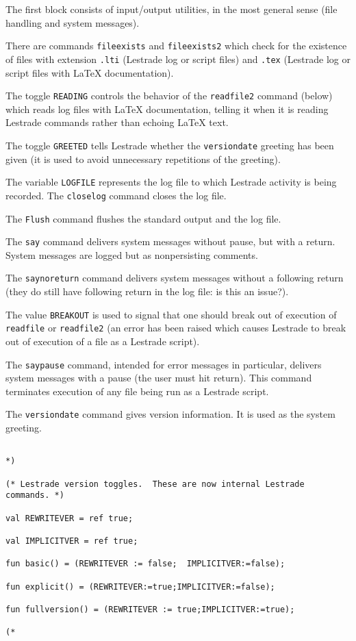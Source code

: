 \documentclass{article}
\begin{document}
The first block consists of input/output utilities, in the most general sense (file handling and system messages).

There are commands {\tt fileexists} and {\tt fileexists2} which check for the existence of 
files with extension {\tt .lti} (Lestrade log or script files) and {\tt .tex} (Lestrade log or
 script files with LaTeX documentation).

The toggle {\tt READING} controls the behavior of the {\tt readfile2} command (below)  which reads log files with LaTeX documentation, telling it when it is reading Lestrade commands rather than echoing LaTeX text.

The toggle {\tt GREETED} tells Lestrade whether the {\tt versiondate} greeting has been given (it is used to avoid unnecessary repetitions of the greeting).

The variable {\tt LOGFILE} represents the log file to which Lestrade activity is being recorded.  The {\tt closelog} command closes the log file.

The {\tt Flush} command flushes the standard output and the log file.

The {\tt say} command delivers system messages without pause, but with a return.  System messages are logged but as nonpersisting comments.

The {\tt saynoreturn} command delivers system messages without a following return (they do still have following return in the log file:  is this an issue?).

The value {\tt BREAKOUT} is used to signal that one should break out of execution of {\tt readfile} or {\tt readfile2} (an error has been raised which causes Lestrade to break out of execution of a  file as a Lestrade script).

The {\tt saypause} command, intended for error messages in particular, delivers system messages with a pause (the user must hit return).  This command terminates execution of any file being run as a Lestrade script.

The {\tt versiondate} command gives version information.  It is used as the system greeting.

\begin{verbatim}

*)

(* Lestrade version toggles.  These are now internal Lestrade commands. *)

val REWRITEVER = ref true;

val IMPLICITVER = ref true;

fun basic() = (REWRITEVER := false;  IMPLICITVER:=false);

fun explicit() = (REWRITEVER:=true;IMPLICITVER:=false);

fun fullversion() = (REWRITEVER := true;IMPLICITVER:=true);

(*

\end{verbatim}
\end{document}
